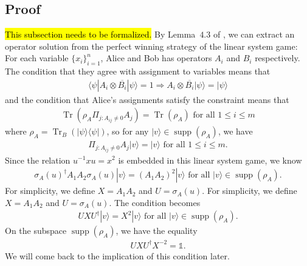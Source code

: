 \documentclass[11pt,letterpaper]{article}
\newcommand{\ket}[1]{|#1\rangle}
\newcommand{\bra}[1]{\langle#1|}
\newcommand{\ketbra}[2]{|#1\rangle\langle#2|}
\DeclareMathOperator{\Tr}{Tr}
\DeclareMathOperator{\supp}{supp}
\newcommand{\1}{\mathbb{1}}
\theoremstyle{definition}
\begin{document}
\subsection{Proof}
\hl{This subsection needs to be formalized.}
By Lemma~$4.3$ of \cite{coladan2017}, we can extract an operator solution from the perfect winning strategy 
of the linear system game: 
For each variable $\{ x_i \}_{i=1}^n$, Alice and Bob has operators $A_i$ and $B_i$ respectively.
The condition that they agree with assignment to variables means that 
\begin{align}
	\bra{\psi} A_i \otimes \overline{B_i} \ket{\psi} = 1 \Rightarrow A_i \otimes \overline{B_i} \ket{\psi} = \ket{\psi}
\end{align}
and the condition that Alice's assignments satisfy the constraint means that 
\begin{align}
	\Tr(\rho_A \Pi_{j: A_{ij} \neq 0} A_j) = \Tr(\rho_A) \text{ for all } 1 \leq i \leq m
\end{align}
where $\rho_A =  \Tr_B(\ketbra{\psi}{\psi})$, so for  any $\ket{v} \in \supp(\rho_A)$,
we have 
\begin{align}
\Pi_{j:A_{ij} \neq 0} A_j \ket{v} = \ket{v} \text{ for all } 1 \leq i \leq m.
\end{align}
Since the relation $u^{-1}xu = x^2$ is embedded in this linear system game, we know
\begin{align}
	\sigma_A(u)^\dagger A_1A_2 \sigma_A(u) \ket{v}= (A_1A_2)^2 \ket{v} \text{ for all } \ket{v} \in \supp(\rho_A).
\end{align}
For simplicity, we define $X = A_1A_2$ and $U = \sigma_A(u)$.
For simplicity, we define $X = A_1A_2$ and $U = \sigma_A(u)$.
The condition becomes
\begin{align}
	UXU^\dagger \ket{v} = X^2 \ket{v} \text{ for all } \ket{v} \in \supp(\rho_A).
\end{align}
On the subspace $\supp(\rho_A)$, we have the equality
\begin{align}
	\label{eq:sim}
	UXU^\dagger X^{-2} = \1.
\end{align}
We will come back to the implication of this condition later.
\end{document}
